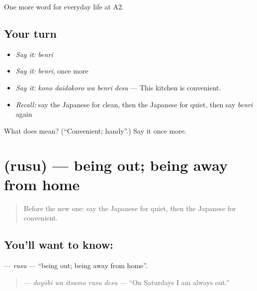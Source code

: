 \begin{grammarlens}[title={What you've built}]
One more word for everyday life at A2.
\end{grammarlens}

\subsection*{Your turn}
\begin{itemize}
\raggedright
  \item \emph{Say it:} \emph{benri}
  \item \emph{Say it:} \emph{benri}, once more
  \item \emph{Say it:} \emph{kono daidokoro wa benri desu} — This kitchen is convenient.
  \item \emph{Recall:} say the Japanese for clean, then the Japanese for quiet, then say \emph{benri} again
\end{itemize}

\begin{tcolorbox}[breakable,colback=teal!4,colframe=teal!35!black,title={Before you move on}]
What does  mean? (\textquotedblleft{}Convenient; handy\textquotedblright{}.) Say it once more.
\end{tcolorbox}
\section[\texorpdfstring{\ja{るす} (rusu)}{るす (rusu)}]{ (rusu) — being out; being away from home}

\label{lesson:JA-C163-rusu}



\begin{quote}
Before the new one: say the Japanese for quiet, then the Japanese for convenient.
\end{quote}

\subsection*{You'll want to know: }
\textbf{} — \emph{rusu} — \textquotedblleft{}being out; being away from home\textquotedblright{}.

\begin{quote}
\textbf{  } — \emph{doyōbi wa itsumo rusu desu} — \textquotedblleft{}On Saturdays I am always out.\textquotedblright{}
\end{quote}

